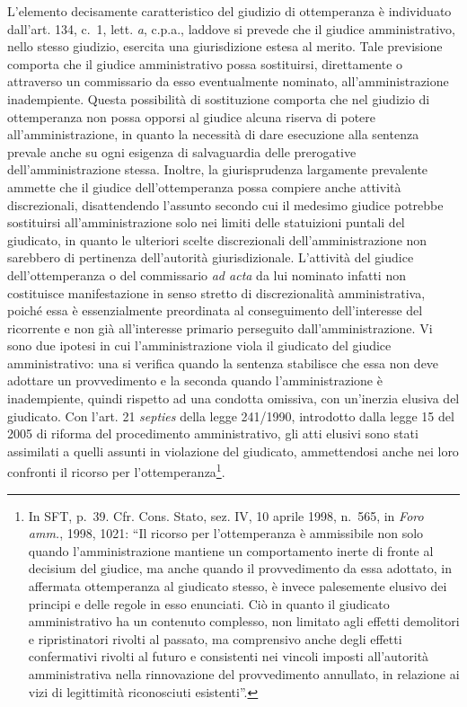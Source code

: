 \documentclass[12pt,it,a4paper,]{report}
\begin{document}
L'elemento decisamente caratteristico del giudizio di ottemperanza è
individuato dall'art. 134, c.~1, lett. \emph{a}, c.p.a., laddove si
prevede che il giudice amministrativo, nello stesso giudizio, esercita
una giurisdizione estesa al merito. Tale previsione comporta che il
giudice amministrativo possa sostituirsi, direttamente o attraverso un
commissario da esso eventualmente nominato, all'amministrazione
inadempiente. Questa possibilità di sostituzione comporta che nel
giudizio di ottemperanza non possa opporsi al giudice alcuna riserva di
potere all'amministrazione, in quanto la necessità di dare esecuzione
alla sentenza prevale anche su ogni esigenza di salvaguardia delle
prerogative dell'amministrazione stessa. Inoltre, la giurisprudenza
largamente prevalente ammette che il giudice dell'ottemperanza possa
compiere anche attività discrezionali, disattendendo l'assunto secondo
cui il medesimo giudice potrebbe sostituirsi all'amministrazione solo
nei limiti delle statuizioni puntali del giudicato, in quanto le
ulteriori scelte discrezionali dell'amministrazione non sarebbero di
pertinenza dell'autorità giurisdizionale. L'attività del giudice
dell'ottemperanza o del commissario \emph{ad acta} da lui nominato
infatti non costituisce manifestazione in senso stretto di
discrezionalità amministrativa, poiché essa è essenzialmente preordinata
al conseguimento dell'interesse del ricorrente e non già all'interesse
primario perseguito dall'amministrazione. Vi sono due ipotesi in cui
l'amministrazione viola il giudicato del giudice amministrativo: una si
verifica quando la sentenza stabilisce che essa non deve adottare un
provvedimento e la seconda quando l'amministrazione è inadempiente,
quindi rispetto ad una condotta omissiva, con un'inerzia elusiva del
giudicato. Con l'art. 21 \emph{septies} della legge 241/1990, introdotto
dalla legge 15 del 2005 di riforma del procedimento amministrativo, gli
atti elusivi sono stati assimilati a quelli assunti in violazione del
giudicato, ammettendosi anche nei loro confronti il ricorso per
l'ottemperanza\footnote{In SFT, p.~39. Cfr. Cons. Stato, sez. IV, 10
  aprile 1998, n.~565, in \emph{Foro amm.}, 1998, 1021: ``Il ricorso per
  l'ottemperanza è ammissibile non solo quando l'amministrazione
  mantiene un comportamento inerte di fronte al decisium del giudice, ma
  anche quando il provvedimento da essa adottato, in affermata
  ottemperanza al giudicato stesso, è invece palesemente elusivo dei
  principi e delle regole in esso enunciati. Ciò in quanto il giudicato
  amministrativo ha un contenuto complesso, non limitato agli effetti
  demolitori e ripristinatori rivolti al passato, ma comprensivo anche
  degli effetti confermativi rivolti al futuro e consistenti nei vincoli
  imposti all'autorità amministrativa nella rinnovazione del
  provvedimento annullato, in relazione ai vizi di legittimità
  riconosciuti esistenti''.}.
\end{document}
